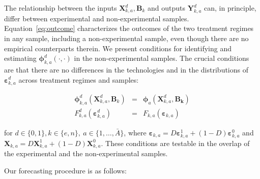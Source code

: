 The relationship between the inputs $\bm{X}^d_{k,a}, \bm{B}_k$ and outputs $\bm{Y}^d_{k,a}$ can, in principle, differ between experimental and non-experimental samples. Equation~\eqref{eq:outcome} characterizes the outcomes of the two treatment regimes in any sample, including a non-experimental sample, even though there are no empirical counterparts therein. We present conditions for identifying and estimating $\bm{\phi}^d_{k,a}\left( \cdot, \cdot \right)$ in the non-experimental samples. The crucial conditions are that there are no differences in the technologies and in the distributions of $\bm{\varepsilon}_{k,a}^d$ across treatment regimes and samples:

\begin{subequations}
\begin{eqnarray}
\bm{\phi}^d_{k,a} (\bm{X}^d_{k,a}, \bm{B}_k) &=& \bm{\phi}_{a} (\bm{X}^d_{k,a}, \bm{B_k}) \label{eq:crucial} \\
F_{k,a}^d \left( \bm{\varepsilon}_{k,a}^d \right) &=&  F_{k,a} \left( \bm{\varepsilon}_{k,a} \right) \label{eq:crucial2}
\end{eqnarray}
\end{subequations}

\noindent for $d \in\{0,1\},  k\in\{e,n\}, \  a\in\{1,\dots,\bar{A}\}$, where $\bm{\varepsilon}_{k,a} = D\bm{\varepsilon}_{k,a}^1 + (1-D)\bm{\varepsilon}_{k,a}^0$ and $\bm{X}_{k,a} = D\bm{X}^1_{k,a}+(1-D)\bm{X}^0_{k,a}$. These conditions are testable in the overlap of the experimental and the non-experimental samples.

Our forecasting procedure is as follows:

